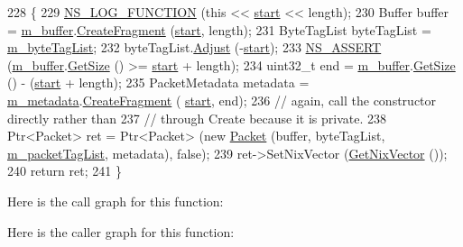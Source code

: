 \begin{DoxyCode}
228 \{
229   \hyperlink{log-macros-disabled_8h_a90b90d5bad1f39cb1b64923ea94c0761}{NS\_LOG\_FUNCTION} (\textcolor{keyword}{this} << \hyperlink{namespacevisualizer_1_1core_a2a35e5d8a34af358b508dac8635754e0}{start} << length);
230   Buffer buffer = \hyperlink{classns3_1_1Packet_a0f17bc9b4177865c9fe48fc927d57996}{m\_buffer}.\hyperlink{classns3_1_1Buffer_a9285016f38b451c65edb50196ef817f8}{CreateFragment} (\hyperlink{namespacevisualizer_1_1core_a2a35e5d8a34af358b508dac8635754e0}{start}, length);
231   ByteTagList byteTagList = \hyperlink{classns3_1_1Packet_a29e08c3cc4220a80366eea801c00e4ba}{m\_byteTagList};
232   byteTagList.\hyperlink{classns3_1_1ByteTagList_a1fec06d7e6daaf8039cf2a148e4090f2}{Adjust} (-\hyperlink{namespacevisualizer_1_1core_a2a35e5d8a34af358b508dac8635754e0}{start});
233   \hyperlink{assert_8h_a6dccdb0de9b252f60088ce281c49d052}{NS\_ASSERT} (\hyperlink{classns3_1_1Packet_a0f17bc9b4177865c9fe48fc927d57996}{m\_buffer}.\hyperlink{classns3_1_1Buffer_a3047b8f2dad303c6370695122f1884f0}{GetSize} () >= \hyperlink{namespacevisualizer_1_1core_a2a35e5d8a34af358b508dac8635754e0}{start} + length);
234   uint32\_t end = \hyperlink{classns3_1_1Packet_a0f17bc9b4177865c9fe48fc927d57996}{m\_buffer}.\hyperlink{classns3_1_1Buffer_a3047b8f2dad303c6370695122f1884f0}{GetSize} () - (\hyperlink{namespacevisualizer_1_1core_a2a35e5d8a34af358b508dac8635754e0}{start} + length);
235   PacketMetadata metadata = \hyperlink{classns3_1_1Packet_af3f95fba7966191bd152bcedd5fbcd6b}{m\_metadata}.\hyperlink{classns3_1_1PacketMetadata_a0c4fe43ab63b49432451c37263826d67}{CreateFragment} (
      \hyperlink{namespacevisualizer_1_1core_a2a35e5d8a34af358b508dac8635754e0}{start}, end);
236   \textcolor{comment}{// again, call the constructor directly rather than}
237   \textcolor{comment}{// through Create because it is private.}
238   Ptr<Packet> ret = Ptr<Packet> (\textcolor{keyword}{new} \hyperlink{classns3_1_1Packet_ac1a30f8cf28346960cfac4a2c9fa7026}{Packet} (buffer, byteTagList, 
      \hyperlink{classns3_1_1Packet_a7c91fc548c7cfddf27c176e13bd858ff}{m\_packetTagList}, metadata), \textcolor{keyword}{false});
239   ret->SetNixVector (\hyperlink{classns3_1_1Packet_a3d68d7d2738678185315b59640848819}{GetNixVector} ());
240   \textcolor{keywordflow}{return} ret;
241 \}
\end{DoxyCode}


Here is the call graph for this function\+:




Here is the caller graph for this function\+:


